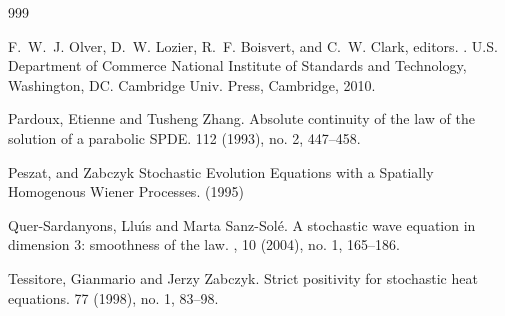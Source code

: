 \documentclass[a4paper,11pt]{article}
\theoremstyle{plain}
\theoremstyle{definition}
\numberwithin{NQ}{section}
\numberwithin{LQ}{section}
\numberwithin{ZQ}{section}
\begin{document}
\begin{small}
\begin{thebibliography}{999}

%
F.~W.~J. Olver, D.~W. Lozier, R.~F. Boisvert, and C.~W. Clark, editors.
.
\newblock U.S. Department of Commerce National Institute of Standards  and Technology, Washington, DC. Cambridge Univ. Press, Cambridge, 2010.

Pardoux, Etienne and Tusheng Zhang.
\newblock Absolute continuity of the law of the solution of a parabolic SPDE.
 112 (1993), no. 2, 447--458.
 
Peszat, and Zabczyk
\newblock Stochastic Evolution Equations with a Spatially Homogenous Wiener Processes.
 (1995)
 
Quer-Sardanyons, Llu{\'{\i}}s and Marta Sanz-Sol{\'e}.
\newblock A stochastic wave equation in dimension 3: smoothness of the law.
, 10 (2004), no. 1, 165--186. 


%




%
Tessitore, Gianmario and Jerzy Zabczyk.
\newblock Strict positivity for stochastic heat equations.
 77 (1998), no. 1, 83--98.


\end{thebibliography}
\end{small}
\end{document}
